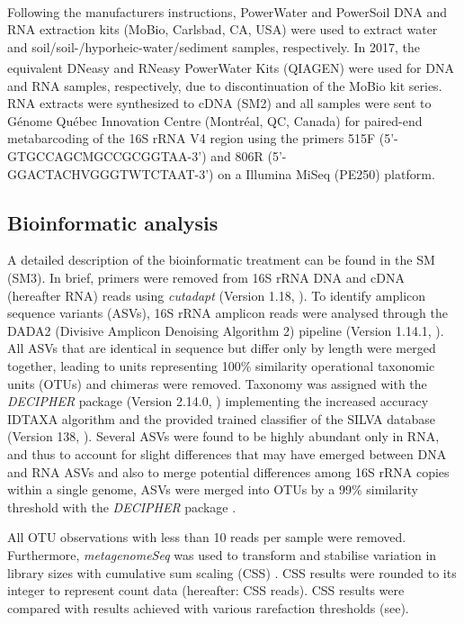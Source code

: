 \documentclass[12pt,a4paper]{article} %
\begin{document}
Following the manufacturers instructions, PowerWater\textsuperscript{\textregistered} and PowerSoil\textsuperscript{\textregistered} DNA and RNA extraction kits (MoBio, Carlsbad, CA, USA) were used to extract water and soil/soil-/hyporheic-water/sediment samples, respectively. In 2017, the equivalent DNeasy\textsuperscript{\textregistered} and RNeasy\textsuperscript{\textregistered} PowerWater\textsuperscript{\textregistered} Kits (QIAGEN\textsuperscript{\textregistered}) were used for DNA and RNA samples, respectively, due to discontinuation of the MoBio kit series. RNA extracts were synthesized to cDNA (SM2) and all samples were sent to G\'{e}nome Qu\'{e}bec Innovation Centre (Montr\'{e}al, QC, Canada) for paired-end metabarcoding of the 16S rRNA V4 region using the primers 515F (5'-GTGCCAGCMGCCGCGGTAA-3') and 806R (5'-GGACTACHVGGGTWTCTAAT-3') on a Illumina MiSeq (PE250) platform.

\subsection*{Bioinformatic analysis}
A detailed description of the bioinformatic treatment can be found in the SM (SM3). In brief, primers were removed from 16S rRNA DNA and cDNA (hereafter RNA) reads using \textit{cutadapt} (Version 1.18, \citet{Martin2013}). To identify amplicon sequence variants (ASVs), 16S rRNA amplicon reads were analysed through the DADA2 (Divisive Amplicon Denoising Algorithm 2) pipeline (Version 1.14.1, \citet{Callahan2017}). All ASVs that are identical in sequence but differ only by length were merged together, leading to units representing 100\% similarity operational taxonomic units (OTUs) and chimeras were removed. Taxonomy was assigned with the \textit{DECIPHER} package (Version 2.14.0, \citet{Wright2016}) implementing the increased accuracy IDTAXA algorithm \citep{Murali2018} and the provided trained classifier of the SILVA database (Version 138, \citet{Pruesse2007}). Several ASVs were found to be highly abundant only in RNA, and thus to account for slight differences that may have emerged between DNA and RNA ASVs and also to merge potential differences among 16S rRNA copies within a single genome, ASVs were merged into OTUs by a 99\% similarity threshold \citep{Vetrovsky2013} with the \textit{DECIPHER} package \citep{Wright2016}.

All OTU observations with less than 10 reads per sample were removed. Furthermore, \textit{metagenomeSeq} was used to transform and stabilise variation in library sizes with cumulative sum scaling (CSS) \citep{Paulson2013}. CSS results were rounded to its integer to represent count data (hereafter: CSS reads). CSS results were compared with results achieved with various rarefaction thresholds (see).
\end{document}
